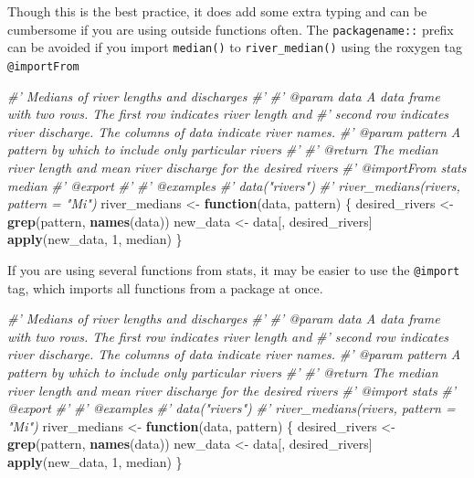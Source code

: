 \documentclass[
]{book}
\newenvironment{Shaded}{\begin{snugshade}}{\end{snugshade}}
\newcommand{\CommentTok}[1]{\textcolor[rgb]{0.56,0.35,0.01}{\textit{#1}}}
\newcommand{\ControlFlowTok}[1]{\textcolor[rgb]{0.13,0.29,0.53}{\textbf{#1}}}
\newcommand{\DecValTok}[1]{\textcolor[rgb]{0.00,0.00,0.81}{#1}}
\newcommand{\KeywordTok}[1]{\textcolor[rgb]{0.13,0.29,0.53}{\textbf{#1}}}
\newcommand{\NormalTok}[1]{#1}
\newcommand{\StringTok}[1]{\textcolor[rgb]{0.31,0.60,0.02}{#1}}
\begin{document}
Though this is the best practice, it does add some extra typing and can be cumbersome if you are using outside functions often. The \texttt{packagename::} prefix can be avoided if you import \texttt{median()} to \texttt{river\_median()} using the roxygen tag \texttt{@importFrom}

\begin{Shaded}
\begin{Highlighting}[]
\CommentTok{#' Medians of river lengths and discharges}
\CommentTok{#'}
\CommentTok{#' @param data A data frame with two rows. The first row indicates river length and}
\CommentTok{#'   second row indicates river discharge. The columns of data indicate river names.}
\CommentTok{#' @param pattern A pattern by which to include only particular rivers}
\CommentTok{#'}
\CommentTok{#' @return The median river length and mean river discharge for the desired rivers}
\CommentTok{#' @importFrom stats median}
\CommentTok{#' @export}
\CommentTok{#'}
\CommentTok{#' @examples}
\CommentTok{#' data("rivers")}
\CommentTok{#' river_medians(rivers, pattern = "Mi")}
\NormalTok{river_medians <-}\StringTok{ }\ControlFlowTok{function}\NormalTok{(data, pattern) \{}
\NormalTok{  desired_rivers <-}\StringTok{ }\KeywordTok{grep}\NormalTok{(pattern, }\KeywordTok{names}\NormalTok{(data))}
\NormalTok{  new_data <-}\StringTok{ }\NormalTok{data[, desired_rivers]}
  \KeywordTok{apply}\NormalTok{(new_data, }\DecValTok{1}\NormalTok{, median)}
\NormalTok{\}}
\end{Highlighting}
\end{Shaded}

If you are using several functions from stats, it may be easier to use the \texttt{@import} tag, which imports all functions from a package at once.

\begin{Shaded}
\begin{Highlighting}[]
\CommentTok{#' Medians of river lengths and discharges}
\CommentTok{#'}
\CommentTok{#' @param data A data frame with two rows. The first row indicates river length and}
\CommentTok{#'   second row indicates river discharge. The columns of data indicate river names.}
\CommentTok{#' @param pattern A pattern by which to include only particular rivers}
\CommentTok{#'}
\CommentTok{#' @return The median river length and mean river discharge for the desired rivers}
\CommentTok{#' @import stats}
\CommentTok{#' @export}
\CommentTok{#'}
\CommentTok{#' @examples}
\CommentTok{#' data("rivers")}
\CommentTok{#' river_medians(rivers, pattern = "Mi")}
\NormalTok{river_medians <-}\StringTok{ }\ControlFlowTok{function}\NormalTok{(data, pattern) \{}
\NormalTok{  desired_rivers <-}\StringTok{ }\KeywordTok{grep}\NormalTok{(pattern, }\KeywordTok{names}\NormalTok{(data))}
\NormalTok{  new_data <-}\StringTok{ }\NormalTok{data[, desired_rivers]}
  \KeywordTok{apply}\NormalTok{(new_data, }\DecValTok{1}\NormalTok{, median)}
\NormalTok{\}}
\end{Highlighting}
\end{Shaded}
\end{document}
